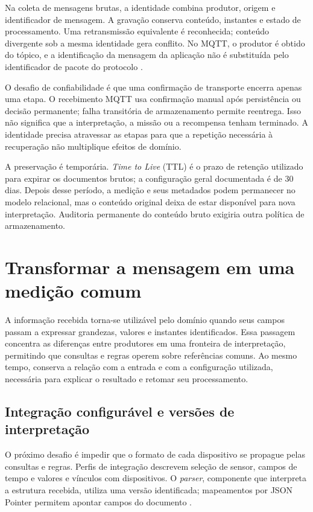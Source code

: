 \documentclass[tcc,capa]{texufpel}
\begin{document}
Na coleta de mensagens brutas, a identidade combina produtor, origem e identificador de mensagem. A gravação conserva conteúdo, instantes e estado de processamento. Uma retransmissão equivalente é reconhecida; conteúdo divergente sob a mesma identidade gera conflito. No MQTT, o produtor é obtido do tópico, e a identificação da mensagem da aplicação não é substituída pelo identificador de pacote do protocolo \cite{oasisMqtt2019}.

O desafio de confiabilidade é que uma confirmação de transporte encerra apenas uma etapa. O recebimento MQTT usa confirmação manual após persistência ou decisão permanente; falha transitória de armazenamento permite reentrega. Isso não significa que a interpretação, a missão ou a recompensa tenham terminado. A identidade precisa atravessar as etapas para que a repetição necessária à recuperação não multiplique efeitos de domínio.

A preservação é temporária. \emph{Time to Live} (TTL) é o prazo de retenção utilizado para expirar os documentos brutos; a configuração geral documentada é de 30 dias. Depois desse período, a medição e seus metadados podem permanecer no modelo relacional, mas o conteúdo original deixa de estar disponível para nova interpretação. Auditoria permanente do conteúdo bruto exigiria outra política de armazenamento.

\section{Transformar a mensagem em uma medição comum}
A informação recebida torna-se utilizável pelo domínio quando seus campos passam a expressar grandezas, valores e instantes identificados. Essa passagem concentra as diferenças entre produtores em uma fronteira de interpretação, permitindo que consultas e regras operem sobre referências comuns. Ao mesmo tempo, conserva a relação com a entrada e com a configuração utilizada, necessária para explicar o resultado e retomar seu processamento.

\subsection{Integração configurável e versões de interpretação}
O próximo desafio é impedir que o formato de cada dispositivo se propague pelas consultas e regras. Perfis de integração descrevem seleção de sensor, campos de tempo e valores e vínculos com dispositivos. O \emph{parser}, componente que interpreta a estrutura recebida, utiliza uma versão identificada; mapeamentos por JSON Pointer permitem apontar campos do documento \cite{jsonpointer2013}.
\end{document}
